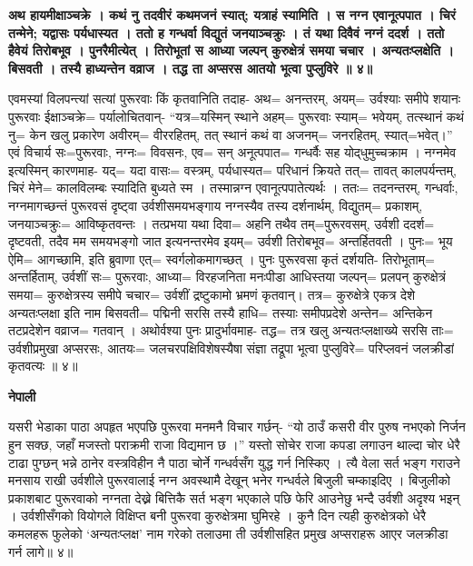 \documentclass[11pt, a5paper]{article}
\begin{document}
\textbf{अथ हायमीक्षाञ्चक्रे । कथं नु तदवीरं कथमजनं स्यात्; यत्राहं स्यामिति । स नग्न एवानूत्पपात । चिरं तन्मेने; यद्वासः पर्यधास्यत । ततो ह गन्धर्वा विद्युतं जनयाञ्चक्रुः । तं यथा दिवैवं नग्नं ददर्श । ततो हैवेयं तिरोबभूव । पुनरैमीत्येत् । तिरोभूतां स आध्या जल्पन् कुरुक्षेत्रं समया चचार । अन्यतःप्लक्षेति । बिसवती । तस्यै हाध्यन्तेन वव्राज । तद्ध ता अप्सरस आतयो भूत्वा पुप्लुविरे ॥ ४॥}

एवमस्यां विलपन्त्यां सत्यां पुरूरवाः किं कृतवानिति तदाह- अथ= अनन्तरम्, अयम्= उर्वश्याः समीपे शयानः पुरूरवाः ईक्षाञ्चक्रे= पर्यालोचितवान्- “यत्र=यस्मिन् स्थाने अहम्= पुरूरवाः स्याम्= भवेयम्, तत्स्थानं कथं नु= केन खलु प्रकारेण अवीरम्= वीररहितम्,  तत् स्थानं कथं वा अजनम्= जनरहितम्, स्यात्=भवेत्।” एवं विचार्य सः=पुरूरवाः, नग्नः= विवसनः, एव= सन् अनूत्पपात= गन्धर्वैः सह योद्‌धुमुच्चक्राम । नग्नमेव इत्यस्मिन् कारणमाह- यद्= यदा वासः= वस्त्रम्, पर्यधास्यत= परिधानं क्रियते तत्= तावत् कालपर्यन्तम्, चिरं मेने= कालविलम्बः स्यादिति बुध्यते स्म । तस्मान्नग्न एवानूत्पपातेत्यर्थः । ततः= तदनन्तरम्, गन्धर्वाः, नग्नमागच्छन्तं पुरूरवसं दृष्ट्वा उर्वशीसमयभङ्गाय नग्नस्यैव तस्य दर्शनार्थम्, विद्युतम्= प्रकाशम्, जनयाञ्चक्रुः= आविष्कृतवन्तः । तत्प्रभया यथा दिवा= अहनि तथैव तम्=पुरूरवसम्, उर्वशी ददर्श= दृष्टवती, तदैव मम समयभङ्गो जात इत्यनन्तरमेव इयम्= उर्वशी तिरोबभूव= अन्तर्हितवती । पुनः= भूय ऐमि= आगच्छामि, इति ब्रुवाणा एत्= स्वर्गलोकमागच्छत् । पुनः पुरूरवसा कृतं दर्शयति- तिरोभूताम्= अन्तर्हिताम्, उर्वशीं सः= पुरूरवाः, आध्या= विरहजनिता मनःपीडा आधिस्तया जल्पन्= प्रलपन् कुरुक्षेत्रं समया= कुरुक्षेत्रस्य समीपे चचार= उर्वशीं द्रष्टुकामो भ्रमणं कृतवान्। तत्र= कुरुक्षेत्रे एकत्र देशे अन्यतःप्लक्षा इति नाम बिसवती= पद्मिनी सरसि तस्यै हाधि= तस्याः समीपप्रदेशे अन्तेन= अन्तिकेन तटप्रदेशेन वव्राज= गतवान् । अथोर्वश्या पुनः प्रादुर्भावमाह- तद्ध= तत्र खलु अन्यतःप्लक्षाख्ये सरसि ताः= उर्वशीप्रमुखा अप्सरसः, आतयः= जलचरपक्षिविशेषस्यैषा संज्ञा तद्रूपा भूत्वा पुप्लुविरे= परिप्लवनं जलक्रीडां कृतवत्यः ॥ ४॥

\textbf{नेपाली}

यसरी भेडाका पाठा अपहृत भएपछि पुरूरवा मनमनै विचार गर्छन्- “यो ठाउँ कसरी वीर पुरुष नभएको निर्जन हुन सक्छ, जहाँ मजस्तो पराक्रमी राजा विद्यमान छ ।” यस्तो सोचेर राजा कपडा लगाउन थाल्दा चोर धेरै टाढा पुग्छन् भन्ने ठानेर वस्त्रविहीन नै पाठा चोर्ने गन्धर्वसँग युद्ध गर्न निस्किए । त्यै वेला सर्त भङ्ग गराउने मनसाय राखी उर्वशीले पुरूरवालाई नग्न अवस्थामै देखून् भनेर गन्धर्वले बिजुली चम्काइदिए । बिजुलीको प्रकाशबाट पुरूरवाको नग्नता देख्ने बित्तिकै सर्त भङ्ग भएकाले पछि फेरि आउनेछु भन्दै उर्वशी अदृश्य भइन् । उर्वशीसँगको वियोगले विक्षिप्त बनी पुरूरवा कुरुक्षेत्रमा  घुमिरहे । कुनै दिन त्यही कुरुक्षेत्रको  धेरै कमलहरू फुलेको ‘अन्यतःप्लक्ष’ नाम गरेको तलाउमा ती उर्वशीसहित प्रमुख अप्सराहरू आएर जलक्रीडा गर्न लागे॥ ४॥
\end{document}
